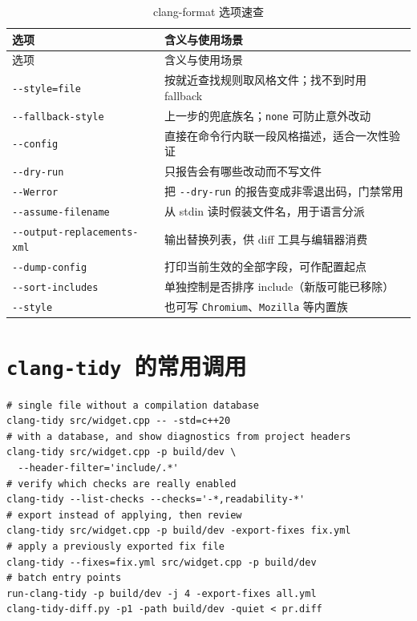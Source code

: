 \documentclass[12pt,a4paper,fontset=fandol]{ctexbook}
\newcommand{\Opt}[1]{\texttt{-\/-#1}}
\newcommand{\Lib}[1]{\textbf{\texttt{#1}}}
\newcommand{\Tidy}{\Lib{clang-tidy}}
\begin{document}
{\footnotesize
\begin{longtable}{@{}>{\raggedright\arraybackslash}p{}
                  >{\raggedright\arraybackslash}p{}@{}}
\caption{clang-format 选项速查}\label{tab:appB-fmt}\\
\toprule
选项 & 含义与使用场景 \\
\midrule
\endfirsthead
\toprule
选项 & 含义与使用场景 \\
\midrule
\endhead
\bottomrule
\endlastfoot
\Opt{style=file} & 按就近查找规则取风格文件；找不到时用 fallback \\
\Opt{fallback-style} & 上一步的兜底族名；\texttt{none} 可防止意外改动 \\
\Opt{config} & 直接在命令行内联一段风格描述，适合一次性验证 \\
\Opt{dry-run} & 只报告会有哪些改动而不写文件 \\
\Opt{Werror} & 把 \Opt{dry-run} 的报告变成非零退出码，门禁常用 \\
\Opt{assume-filename} & 从 stdin 读时假装文件名，用于语言分派 \\
\Opt{output-replacements-xml} & 输出替换列表，供 diff 工具与编辑器消费 \\
\Opt{dump-config} & 打印当前生效的全部字段，可作配置起点 \\
\Opt{sort-includes} & 单独控制是否排序 include（新版可能已移除） \\
\Opt{style} & 也可写 \texttt{Chromium}、\texttt{Mozilla} 等内置族 \\
\end{longtable}
}

\section{\Tidy\ 的常用调用}\label{sec:appB-s2}

\begin{lstlisting}[style=shellstyle,caption={clang-tidy 的典型用法}]
# single file without a compilation database
clang-tidy src/widget.cpp -- -std=c++20
# with a database, and show diagnostics from project headers
clang-tidy src/widget.cpp -p build/dev \
  --header-filter='include/.*'
# verify which checks are really enabled
clang-tidy --list-checks --checks='-*,readability-*'
# export instead of applying, then review
clang-tidy src/widget.cpp -p build/dev -export-fixes fix.yml
# apply a previously exported fix file
clang-tidy --fixes=fix.yml src/widget.cpp -p build/dev
# batch entry points
run-clang-tidy -p build/dev -j 4 -export-fixes all.yml
clang-tidy-diff.py -p1 -path build/dev -quiet < pr.diff
\end{lstlisting}
\end{document}
